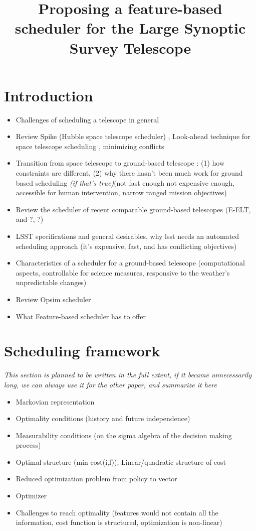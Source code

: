 \documentclass[12pt]{article}
\begin{document}
\title{Proposing a feature-based scheduler for the Large Synoptic Survey Telescope}
\maketitle
\section{Introduction} \label{sec:intro}

\begin{itemize}
\item Challenges of scheduling a telescope in general
\item Review Spike (Hubble space telescope scheduler) \cite{johnston1994spike}, Look-ahead technique for space telescope scheduling \cite{sadeh1991look}, minimizing conflicts \cite{minton1992minimizing}
\item Transition from space telescope to ground-based telescope : (1) how constraints are different, (2) why there hasn't been much work for ground based scheduling \textit{(if that's true)}(not fast enough not expensive enough, accessible for human intervention, narrow ranged mission objectives)
\item Review the scheduler of recent comparable ground-based telescopes (E-ELT, and ?, ?)
\item LSST specifications and general desirables, why lsst needs an automated scheduling approach (it's expensive, fast, and has conflicting objectives)
\item Characteristics of a scheduler for a ground-based telescope (computational aspects, controllable for science measures, responsive to the weather's unpredictable changes)
\item Review Opsim scheduler \cite{delgado2016lsst}
\item What Feature-based scheduler has to offer
\end{itemize}
 
 
\section{Scheduling framework}\label{sec_SM}
\textit{This section is planned to be written in the full extent, if it became unnecessarily long, we can always use it for the other paper, and summarize it here}
\begin{itemize}
\item Markovian representation
\item Optimality conditions (history and future independence)
\item Measurability conditions (on the sigma algebra of the decision making process)
\item Optimal structure (min cost(i,f)), Linear/quadratic structure of cost
\item Reduced optimization problem from policy to vector
\item Optimizer
\item Challenges to reach optimality (features would not contain all the information, cost function is structured, optimization is non-linear)
\end{itemize}
\end{document}
